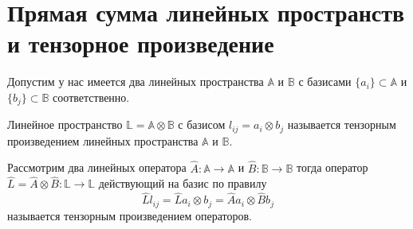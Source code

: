 \section{Прямая сумма линейных пространств и тензорное произведение}

Допустим у нас имеется два линейных пространства $\mathbb{A}$ и 
$\mathbb{B}$ с базисами $\{a_i\} \subset \mathbb{A}$ и
$\{b_j\} \subset \mathbb{B}$ соответственно. 

\begin{definition}
Линейное пространство $\mathbb{L} = \mathbb{A} \otimes \mathbb{B}$ с
базисом $l_{ij} = a_i \otimes b_j$ называется тензорным произведением
линейных пространства $\mathbb{A}$ и $\mathbb{B}$. 
\end{definition}

\begin{definition}
\label{def:tensorprod}
Рассмотрим два линейных оператора $\hat{A}: \mathbb{A} \to \mathbb{A}$
и $\hat{B} : \mathbb{B} \to \mathbb{B}$ тогда оператор 
$\hat{L} = \hat{A} \otimes \hat{B} : \mathbb{L} \to \mathbb{L}$
действующий на базис по правилу
\[
\hat{L} l_{ij} = 
\hat{L} a_i \otimes b_j = 
\hat{A} a_i \otimes \hat{B} b_j
\]
называется тензорным произведением операторов.
\end{definition}
